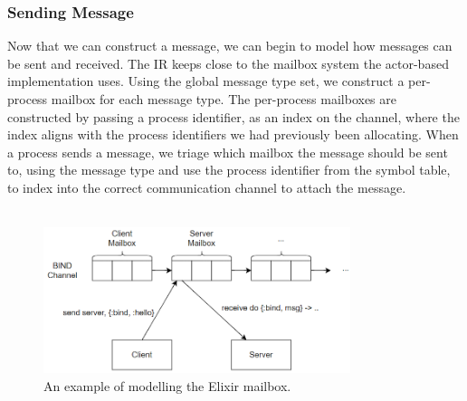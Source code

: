 \subsubsection{Sending Message}
Now that we can construct a message, we can begin to model how messages can be sent and received. The IR keeps close to the mailbox system the actor-based implementation uses. Using the global message type set, we construct a per-process mailbox for each message type. The per-process mailboxes are constructed by passing a process identifier, as an index on the channel, where the index aligns with the process identifiers we had previously been allocating. When a process sends a message, we triage which mailbox the message should be sent to, using the message type and use the process identifier from the symbol table, to index into the correct communication channel to attach the message.
\\ \\
\begin{figure}[h]
    \centering
    \includegraphics[width=0.8\textwidth]{images/promela_messages.png}
    \caption{An example of modelling the Elixir mailbox.}
    \label{fig:promela_mailbox}
\end{figure}
\\ \\
